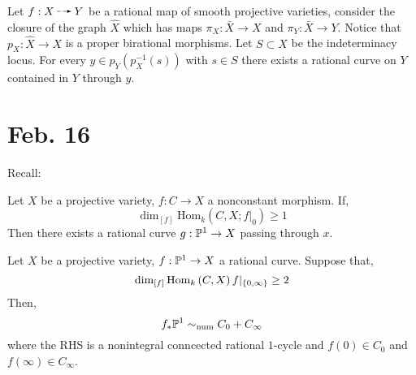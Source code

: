 \documentclass[12pt]{article}
\newcommand{\fixHom}[4]{\mathrm{Hom}_{#1} \left( #2, #3 ; #4 \right)}
\begin{document}
\begin{cor}
Let $f : X \rat Y$ be a rational map of smooth projective varieties, consider the closure of the graph $\hat{X}$ which has maps $\pi_X : \bar{X} \to X$ and $\pi_Y : \bar{X} \to Y$. Notice that $p_X : \hat{X} \to X$ is a proper birational morphisms. Let $S \subset X$ be the indeterminacy locus. For every $y \in p_Y(p_X^{-1}(s))$ with $s \in S$ there exists a rational curve on $Y$ contained in $Y$ through $y$. 
\end{cor} 

\section{Feb. 16}

Recall:

\begin{thm} 
Let $X$ be a projective variety, $f : C \to X$ a nonconstant morphism. If,
\[ \dim_{[f]} \fixHom{k}{C}{X}{f|_{0}} \ge 1 \]
Then there exists a rational curve $g : \P^1 \to X$ passing through $x$.
\end{thm}

\begin{thm}
Let $X$ be a projective variety, $f : \P^1 \to X$ a rational curve. Suppose that,
 \[ \dim_{[f]} \Hom{k}{C}{X}{f|_{\{0,\infty\}}} \ge 2 \]
Then,
 \[ f_* \P^1 \sim_{\text{num}} C_0 + C_\infty \]
where the RHS is a nonintegral conncected rational $1$-cycle and $f(0) \in C_0$ and $f(\infty) \in C_\infty$. 
\end{thm}
\end{document}
